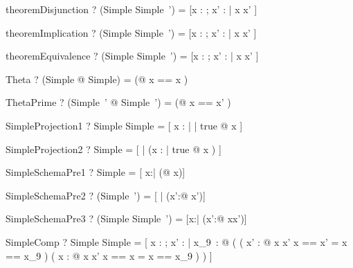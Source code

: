 \begin{theorem}{theoremDisjunction}
  \vdash? (Simple \lor Simple~') = [x : \arithmos; x' : \arithmos | x \in \nat \lor x' \in \nat]
\end{theorem}

\begin{theorem}{theoremImplication}
  \vdash? (Simple \implies Simple~') = [x : \arithmos; x' : \arithmos | x \in \nat \implies x' \in \nat]
\end{theorem}

\begin{theorem}{theoremEquivalence}
  \vdash? (Simple \iff Simple~') = [x : \arithmos; x' : \arithmos | x \in \nat \iff x' \in \nat]
\end{theorem}

\begin{theorem}{Theta}
  \vdash? (\mu Simple @ \theta Simple) =
          (\mu [x : \nat] @ \lblot x == x \rblot )
\end{theorem}

\begin{theorem}{ThetaPrime}
  \vdash? (\mu Simple~' @ \theta Simple~') =
          (\mu [x' : \nat] @ \lblot x == x' \rblot )
\end{theorem}

\begin{theorem}{SimpleProjection1}
  \vdash? Simple \project Simple = [ x : \nat | \exists | true @ x \in \nat ]
\end{theorem}

\begin{theorem}{SimpleProjection2}
  \vdash? Simple \project [| true] = [ | (\exists  x : \arithmos | true @ x \in \nat) ]
\end{theorem}

\begin{theorem}{SimpleSchemaPre1}
  \vdash? \pre Simple = [ x:\arithmos | (\exists @ x\in\nat)]
\end{theorem}

\begin{theorem}{SimpleSchemaPre2}
  \vdash? \pre (Simple~') = [ | (\exists x':\arithmos @ x'\in\nat)]
\end{theorem}

\begin{theorem}{SimpleSchemaPre3}
  \vdash? \pre (Simple \land Simple~') =
          [x:\arithmos | (\exists x':\arithmos @ x\in\nat \land x'\in\nat)]
\end{theorem}

\begin{theorem}{SimpleComp}
  \vdash? \Delta Simple \semi \Delta Simple =
	  [ x : \arithmos ; x' : \arithmos
		|
		  \exists x_{9}~: \arithmos @
			  ( ( \exists x' : \arithmos @
				      x \in \nat \land x' \in \nat  \land \lblot x == x' \rblot = \lblot x == x_{9} \rblot )
					\land
					( \exists x : \arithmos @
					    x \in \nat \land x' \in \nat \land \lblot x == x \rblot = \lblot x == x_{9} \rblot )  ) ]
\end{theorem}

